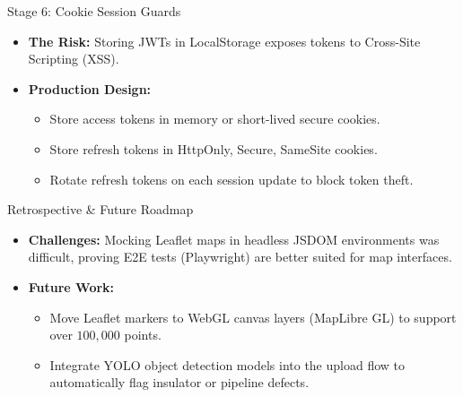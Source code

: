 \documentclass[aspectratio=169]{beamer}
\begin{document}
\begin{frame}{Stage 6: Cookie Session Guards}
  \begin{itemize}
    \item \textbf{The Risk:} Storing JWTs in LocalStorage exposes tokens to Cross-Site Scripting (XSS).
    \item \textbf{Production Design:}
      \begin{itemize}
        \item Store access tokens in memory or short-lived secure cookies.
        \item Store refresh tokens in HttpOnly, Secure, SameSite cookies.
        \item Rotate refresh tokens on each session update to block token theft.
      \end{itemize}
  \end{itemize}
\end{frame}

\begin{frame}{Retrospective \& Future Roadmap}
  \begin{itemize}
    \item \textbf{Challenges:} Mocking Leaflet maps in headless JSDOM environments was difficult, proving E2E tests (Playwright) are better suited for map interfaces.
    \item \textbf{Future Work:}
      \begin{itemize}
        \item Move Leaflet markers to WebGL canvas layers (MapLibre GL) to support over $100,000$ points.
        \item Integrate YOLO object detection models into the upload flow to automatically flag insulator or pipeline defects.
      \end{itemize}
  \end{itemize}
\end{frame}
\end{document}
